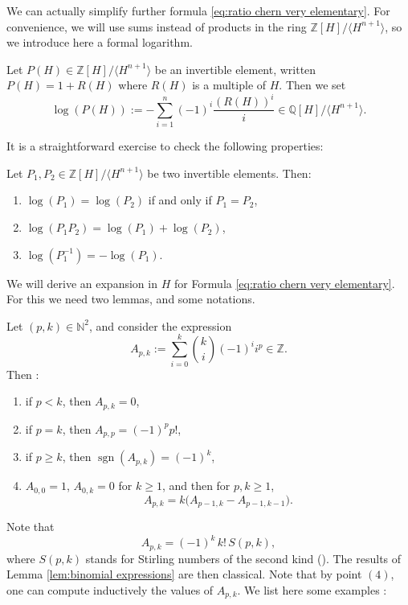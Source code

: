 \documentclass[a4paper,10pt]{amsart}
\theoremstyle{plain}{
    \newtheorem{theorem}{Theorem}[section]
    \newtheorem{lemma}[theorem]{Lemma}
    \newtheorem{corollary}[theorem]{Corollary}
    \newtheorem{proposition}[theorem]{Proposition}
    \newtheorem{conjecture}[theorem]{Conjecture}
}
\theoremstyle{definition}{
    \newtheorem{definition}[theorem]{Definition}
    \newtheorem{defn-thm}[theorem]{Definition-Theorem}
    \newtheorem{example}[theorem]{Example}
    \newtheorem{notation}[theorem]{Notation}
}
\theoremstyle{remark}{
    \newtheorem{remark}[theorem]{Remark}
    \newtheorem{problem}[theorem]{Problem}
    \newtheorem{question}[theorem]{Question}
}
\def\Q{\mathbb{Q}}
\def\Z{\mathbb{Z}}
\def\N{\mathbb{N}}
\begin{document}
We can actually simplify further formula \eqref{eq:ratio chern very elementary}. For convenience, we will use sums instead of products in the ring $\Z[H]/\langle H^{n+1} \rangle$, so we introduce here a formal logarithm. 
\begin{definition}                                                                                                                                                                                                                                                          \label{eq:formal log}
Let $P(H)\in  \Z[H]/\langle H^{n+1} \rangle$ be an invertible element, written $P(H)=1+R(H)$ where $R(H)$ is a multiple of $H$. Then we set
$$
\log(P(H)):=-\sum_{i=1}^n (-1)^i \frac{(R(H))^i}{i}\in \Q[H]/\langle H^{n+1} \rangle.
$$
\end{definition}
It is a straightforward exercise to check the following properties:
\begin{lemma}
 \label{lem:log properties}
 Let $P_1,P_2\in\Z[H]/\langle H^{n+1} \rangle$ be two invertible elements. Then:
 \begin{enumerate}
  \item $\log(P_1)=\log(P_2)$ if and only if $P_1=P_2$,
  \item $\log(P_1P_2)=\log(P_1)+\log(P_2)$,
  \item $\log(P_1^{-1})=-\log(P_1)$.
 \end{enumerate}
\end{lemma}
We will derive an expansion in $H$ for Formula \eqref{eq:ratio chern very elementary}. For this we need two lemmas, and some notations.
 \begin{lemma}
  \label{lem:binomial expressions}
  Let $(p,k)\in\N^2$, and consider the expression
  $$
  A_{p,k}:=\sum_{i=0}^k\binom{k}{i}(-1)^ii^p\in\Z.
  $$
  Then :
  \begin{enumerate}
   \item if $p<k$, then $A_{p,k}=0$,
   \item if $p=k$, then $A_{p,p}=(-1)^pp!$,
   \item if $p \geq k$, then $\operatorname{sgn}(A_{p,k}) = (-1)^k$,
   \item $ A_{0,0}=1$,  $A_{0,k}=0$ for $k\geq 1$, and then for $p,k\geq 1$,
   $$
   A_{p,k} = k \Big( A_{p-1,k} - A_{p-1,k-1} \Big).$$ 
  \end{enumerate}
 \end{lemma}
  Note that
 $$
A_{p,k} = (-1)^k \, k! \, S(p,k),
 $$
 where $S(p,k)$ stands for Stirling numbers of the second kind (\cite[Chapter 13, Equation (13.13)]{VanLintWilson}). The results of Lemma \ref{lem:binomial expressions} are then classical. Note that by point $(4)$, one can compute inductively the values of $A_{p,k}$. We list here some examples :
%  
\end{document}
